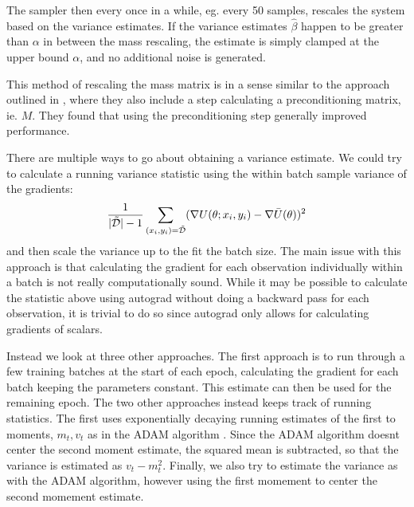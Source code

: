 The sampler then every once in a while, eg. every 50 samples, rescales the system based on the variance estimates. If the variance estimates $\hat \beta$ happen to be greater than $\alpha$ in between the mass rescaling, the estimate is simply clamped at the upper bound $\alpha$, and no additional noise is generated.  

This method of rescaling the mass matrix is in a sense similar to the approach outlined in \cite{wenzel_how_2020}, where they also include a step calculating a preconditioning matrix, ie. $M$. They found that using the preconditioning step generally improved performance.

There are multiple ways to go about obtaining a variance estimate. We could try to calculate a running variance statistic using the within batch sample variance of the gradients:
\begin{equation}
    \frac{1}{|\tilde{\mathcal{D}}|-1}\sum_{(x_i,y_i)=\tilde{\mathcal{D}}} (\nabla U(\theta; x_i, y_i) - \nabla \bar{U}(\theta))^2
\end{equation}
and then scale the variance up to the fit the batch size. 
The main issue with this approach is that calculating the gradient for each observation individually within a batch is not really computationally sound. While it may be possible to calculate the statistic above using autograd without doing a backward pass for each observation, it is trivial to do so since autograd only allows for calculating gradients of scalars. 

Instead we look at three other approaches. 
The first approach is to run through a few training batches at the start of each epoch, calculating the gradient for each batch keeping the parameters constant. 
This estimate can then be used for the remaining epoch. 
The two other approaches instead keeps track of running statistics. 
The first uses exponentially decaying running estimates of the first to moments, $m_t, v_t$ as in the ADAM algorithm \cite{kingma_adam_2017}. Since the ADAM algorithm doesnt center the second moment estimate, the squared mean is subtracted, so that the variance is estimated as $v_t - m_t^2$.
Finally, we also try to estimate the variance as with the ADAM algorithm, however using the first momement to center the second momement estimate. 

